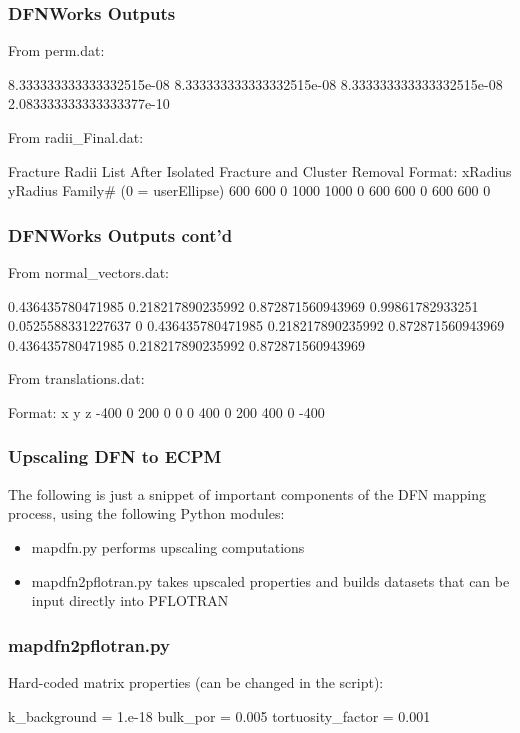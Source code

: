 \documentclass{beamer}
\begin{document}
\begin{frame} \frametitle{DFNWorks Outputs}
	From perm.dat:
	\begin{semiverbatim}
		8.333333333333332515e-08
		8.333333333333332515e-08
		8.333333333333332515e-08
		2.083333333333333377e-10
	\end{semiverbatim}
	From radii\_Final.dat:
	\begin{semiverbatim}
		Fracture Radii List After Isolated Fracture 
		   and Cluster Removal
		Format: xRadius yRadius Family# (0 = userEllipse)
		600 600 0
		1000 1000 0
		600 600 0
		600 600 0
	\end{semiverbatim}
	
\end{frame}

\begin{frame} \frametitle{DFNWorks Outputs cont'd}
	From normal\_vectors.dat:
	\begin{semiverbatim}
		0.436435780471985 0.218217890235992 0.872871560943969
		0.99861782933251 0.0525588331227637 0
		0.436435780471985 0.218217890235992 0.872871560943969
		0.436435780471985 0.218217890235992 0.872871560943969
	\end{semiverbatim}
	From translations.dat:
	\begin{semiverbatim}
		Format: x y z 
		-400 0 200
		0 0 0
		400 0 200
		400 0 -400
	\end{semiverbatim}
	
\end{frame}

\begin{frame} \frametitle{Upscaling DFN to ECPM}
	The following is just a snippet of important components of the DFN mapping process, using the following Python modules:
	\begin{itemize}
		\item mapdfn.py performs upscaling computations
		\item mapdfn2pflotran.py takes upscaled properties and builds datasets that can be input directly into PFLOTRAN
	\end{itemize}
\end{frame}

\begin{frame} \frametitle{mapdfn2pflotran.py}
	Hard-coded matrix properties (can be changed in the script):
	\begin{semiverbatim}
		
		k_background = 1.e-18
		bulk_por = 0.005
		tortuosity_factor = 0.001
		
	\end{semiverbatim}
	
\end{frame}
\end{document}

